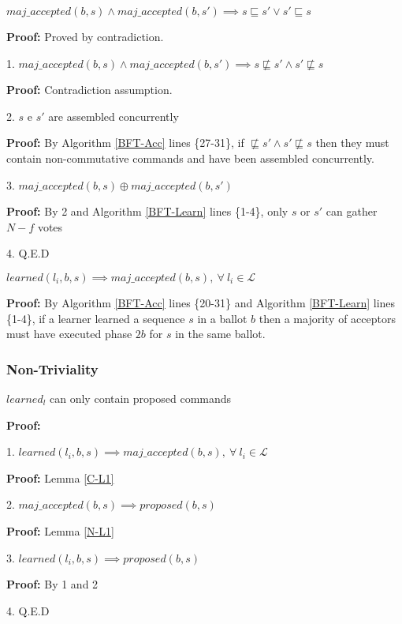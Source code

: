 \begin{lemma}
$maj\_accepted(b,s) \land maj\_accepted(b,s') \implies s \sqsubseteq s' \lor s' \sqsubseteq s$ \label{C-L3} \par
\end{lemma}
\textbf{Proof:} Proved by contradiction.\par
1. $maj\_accepted(b,s) \land maj\_accepted(b,s') \implies s \not\sqsubseteq s' \land s' \not\sqsubseteq s$ \par
\indent\indent\textbf{Proof:} Contradiction assumption.\par
2. $s$ e $s'$ are assembled concurrently \par
\indent\indent\textbf{Proof:} By Algorithm \ref{BFT-Acc} lines \{27-31\}, if $\not\sqsubseteq s' \land s' \not\sqsubseteq s$ then they must contain non-commutative commands and have been assembled concurrently. \par
3. $maj\_accepted(b,s) \oplus maj\_accepted(b,s')$ \par
\indent\indent\textbf{Proof:} By 2 and Algorithm \ref{BFT-Learn} lines \{1-4\}, only $s$ or $s'$ can gather $N-f$ votes  \par
4. Q.E.D \par

\begin{lemma}
$learned(l_i,b,s) \implies maj\_accepted(b,s),\ \forall\ l_i \in \mathcal{L}$ \label{C-L1} \par
\end{lemma} 
\textbf{Proof:} By Algorithm \ref{BFT-Acc} lines \{20-31\} and Algorithm \ref{BFT-Learn} lines \{1-4\}, if a learner learned a sequence $s$ in a ballot $b$ then a majority of acceptors must have executed phase $2b$ for $s$ in the same ballot.

\subsubsection{Non-Triviality}
\begin{theorem}
$learned_l$ can only contain proposed commands \label{N-T1} \par
\end{theorem} 
\textbf{Proof:} \par
1. $learned(l_i,b,s) \implies maj\_accepted(b,s),\ \forall\ l_i \in \mathcal{L}$ \par
\indent\indent\textbf{Proof:} Lemma \ref{C-L1} \par
2. $maj\_accepted(b,s) \implies proposed(b,s)$ \par
\indent\indent\textbf{Proof:} Lemma \ref{N-L1}\par
3. $learned(l_i,b,s) \implies proposed(b,s)$ \par
\indent\indent\textbf{Proof:} By 1 and 2 \par
4. Q.E.D \par

